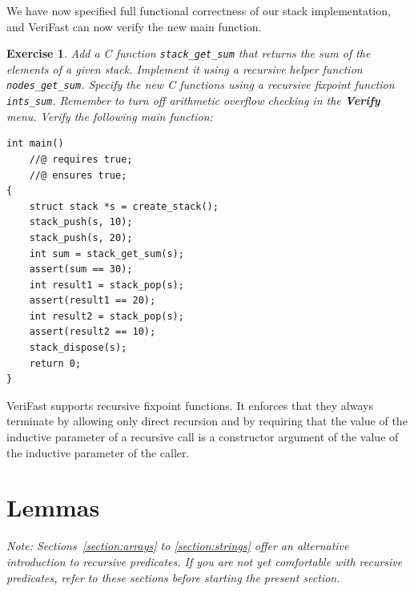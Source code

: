\documentclass{article}
\newtheorem{exercise}{Exercise}
\begin{document}
We have now specified full functional correctness of our stack
implementation, and VeriFast can now verify the new main
function.

\begin{exercise}\label{exercise:sum_full}
Add a C function \lstinline!stack_get_sum! that returns the sum
of the elements of a given stack. Implement it using a
recursive helper function \lstinline!nodes_get_sum!. Specify
the new C functions using a recursive fixpoint function
\lstinline!ints_sum!. Remember to turn off arithmetic
overflow checking in the \textbf{Verify} menu. Verify the
following main function:
\end{exercise}
\begin{lstlisting}
int main()
    //@ requires true;
    //@ ensures true;
{
    struct stack *s = create_stack();
    stack_push(s, 10);
    stack_push(s, 20);
    int sum = stack_get_sum(s);
    assert(sum == 30);
    int result1 = stack_pop(s);
    assert(result1 == 20);
    int result2 = stack_pop(s);
    assert(result2 == 10);
    stack_dispose(s);
    return 0;
}
\end{lstlisting}

VeriFast supports recursive fixpoint functions. It enforces
that they always terminate by allowing only direct recursion
and by requiring that the value of the inductive parameter of a
recursive call is a constructor argument of the value of the
inductive parameter of the caller.

\section{Lemmas}\label{section:lemmas}

\emph{Note: Sections~\ref{section:arrays} to
\ref{section:strings} offer an alternative introduction to
recursive predicates. If you are not yet comfortable with
recursive predicates, refer to these sections before starting
the present section.}
\end{document}
